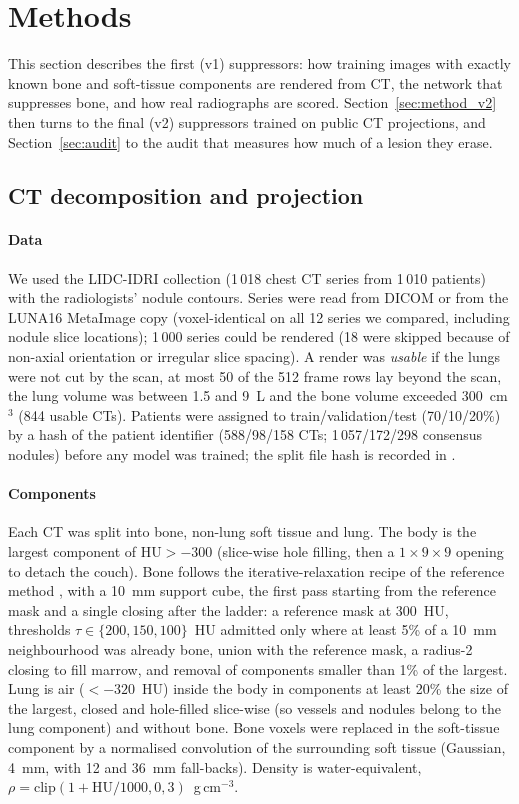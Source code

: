 \section{Methods}
\label{sec:methods}
This section describes the first (v1) suppressors: how training images with exactly known bone and soft-tissue components are rendered
from CT, the network that suppresses bone, and how real radiographs are scored. Section~\ref{sec:method_v2} then turns to the final (v2)
suppressors trained on public CT projections, and Section~\ref{sec:audit} to the audit that measures how much of a lesion they erase.

\subsection{CT decomposition and projection}
\paragraph{Data} We used the LIDC-IDRI collection (1\,018 chest CT series from 1\,010 patients) with the radiologists' nodule contours.
Series were read from DICOM or from the LUNA16 MetaImage copy (voxel-identical on all 12 series we compared, including nodule slice locations); 1\,000 series
could be rendered (18 were skipped because of non-axial orientation or irregular slice spacing). A render was \emph{usable} if the lungs were not cut by the
scan, at most 50 of the 512 frame rows lay beyond the scan, the lung volume was between 1.5 and 9~L and the bone volume exceeded 300~cm$^3$
(844 usable CTs). Patients were assigned to train/validation/test (70/10/20\%) by a hash of the patient identifier (588/98/158 CTs; 1\,057/172/298
consensus nodules) before any model was trained; the split file hash is recorded in .

\paragraph{Components} Each CT was split into bone, non-lung soft tissue and lung. The body is the largest component of $\mathrm{HU}>-300$
(slice-wise hole filling, then a $1{\times}9{\times}9$ opening to detach the couch). Bone follows the iterative-relaxation recipe of the reference method \citep[Algorithm~1]{angaitkar2026anatomy}, with a 10~mm support cube,
the first pass starting from the reference mask and a single closing after the ladder:
a reference mask at 300~HU, thresholds $\tau\in\{200,150,100\}$~HU admitted only where at least 5\% of a 10~mm neighbourhood was already bone, union with the
reference mask, a radius-2 closing to fill marrow, and removal of components smaller than 1\% of the largest. Lung is air ($<-320$~HU) inside the body in
components at least 20\% the size of the largest, closed and hole-filled slice-wise (so vessels and nodules belong to the lung component) and
without bone. Bone voxels were replaced in the soft-tissue component by a normalised convolution of the surrounding soft tissue (Gaussian, 4~mm, with
12 and 36~mm fall-backs). Density is water-equivalent, $\rho=\mathrm{clip}(1+\mathrm{HU}/1000,0,3)$~g\,cm$^{-3}$.


